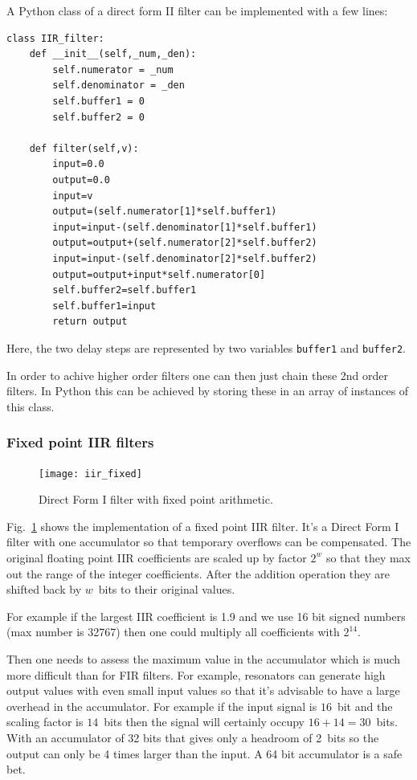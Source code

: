 \documentclass[12pt,a4paper]{article}
\begin{document}
A Python class of a direct form II filter can be implemented
with a few lines:
\begin{verbatim}
class IIR_filter:
    def __init__(self,_num,_den):
        self.numerator = _num
        self.denominator = _den
        self.buffer1 = 0
        self.buffer2 = 0

    def filter(self,v):
        input=0.0
        output=0.0
        input=v
        output=(self.numerator[1]*self.buffer1)
        input=input-(self.denominator[1]*self.buffer1)
        output=output+(self.numerator[2]*self.buffer2)
        input=input-(self.denominator[2]*self.buffer2)
        output=output+input*self.numerator[0]
        self.buffer2=self.buffer1
        self.buffer1=input
        return output
\end{verbatim}
Here, the two delay steps are represented by two variables
\texttt{buffer1} and \texttt{buffer2}.

In order to achive higher order filters one can then just
chain these 2nd order filters. In Python this can be achieved
by storing these in an array of instances of this class.

\subsubsection{Fixed point IIR filters}
\begin{figure}[!hbt]
\begin{center}
\mbox{\texttt{[image: iir\_fixed]}}
\end{center}
\caption{Direct Form I filter with fixed point arithmetic.
\label{iir_fixed}}
\end{figure}
Fig.~\ref{iir_fixed} shows the implementation of a fixed point IIR
filter. It's a Direct Form I filter with one accumulator so that
temporary overflows can be compensated. The original floating point
IIR coefficients are scaled up by factor $2^w$ so that they max out
the range of the integer coefficients. After the addition operation
they are shifted back by $w$~bits to their original values.

For example if the largest IIR coefficient is 1.9 and we use 16 bit
signed numbers (max number is 32767) then one could multiply all
coefficients with $2^{14}$.

Then one needs to assess the maximum value in the accumulator which
is much more difficult than for FIR filters. For example,
resonators can generate high output values with even small input values
so that it's advisable to have a large overhead in the accumulator.
For example if the input signal is $16$~bit and the scaling factor is
$14$~bits then the signal will certainly occupy $16+14=30$~bits. With
an accumulator of 32 bits that gives only a headroom of 2~bits so the
output can only be 4 times larger than the input. A 64 bit accumulator
is a safe bet.
\end{document}
